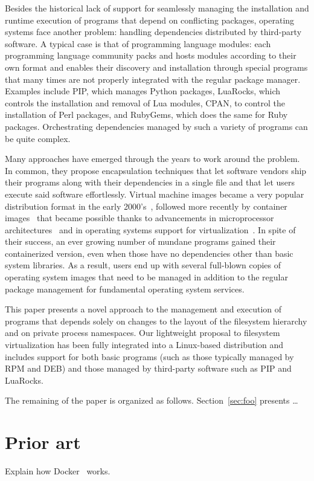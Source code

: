 \documentclass[sigplan, anonymous]{acmart}
\begin{document}
Besides the historical lack of support for seamlessly managing the installation and runtime
execution of programs that depend on conflicting packages, operating systems face another problem:
handling dependencies distributed by third-party software. A typical case is that of programming
language modules: each programming language community packs and hosts modules according to their own
format and enables their discovery and installation through special programs that many times are not
properly integrated with the regular package manager. Examples include PIP, which manages Python
packages, LuaRocks, which controls the installation and removal of Lua modules, CPAN, to control the
installation of Perl packages, and RubyGems, which does the same for Ruby packages. Orchestrating
dependencies managed by such a variety of programs can be quite complex.

Many approaches have emerged through the years to work around the problem. In common, they propose
encapsulation techniques that let software vendors ship their programs along with their dependencies
in a single file and that let users execute said software effortlessly. Virtual machine images
became a very popular distribution format in the early 2000's~\cite{Who?}, followed more recently by
container images~\cite{fink2014docker} that became possible thanks to advancements in microprocessor
architectures~\cite{Intel} and in operating systems support for virtualization~\cite{KVM}. In spite
of their success, an ever growing number of mundane programs gained their containerized version,
even when those have no dependencies other than basic system libraries. As a result, users end up
with several full-blown copies of operating system images that need to be managed in addition to
the regular package management for fundamental operating system services.

This paper presents a novel approach to the management and execution of programs that depends
solely on changes to the layout of the filesystem hierarchy and on private process namespaces.
Our lightweight proposal to filesystem virtualization has been fully integrated into a Linux-based
distribution and includes support for both basic programs (such as those typically managed by RPM
and DEB) and those managed by third-party software such as PIP and LuaRocks.

The remaining of the paper is organized as follows. Section~\ref{sec:foo} presents \ldots

\section{Prior art}
Explain how Docker~\cite{fink2014docker} works.
\end{document}
